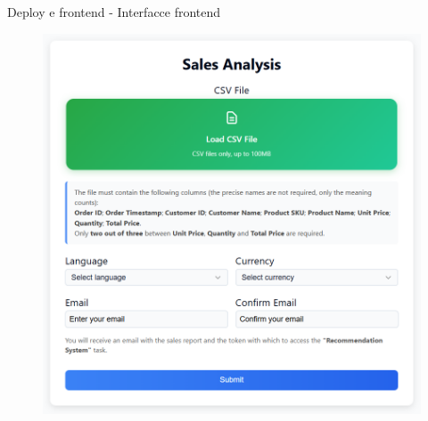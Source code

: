 \documentclass{beamer}
\begin{document}
\begin{frame}{Deploy e frontend - Interfacce frontend}
		\begin{figure}
			\centering
			\begin{minipage}{0.4\textwidth}
				\centering
				\includegraphics[width=\textwidth]{Frontend Sales Analysis.png}
			\end{minipage}
			\hspace{0.05\textwidth}
			\begin{minipage}{0.2\textwidth}
				\centering

\end{minipage}
\end{figure}
\end{frame}
\end{document}
